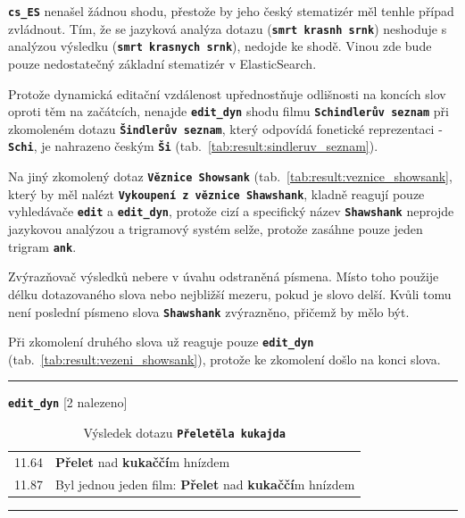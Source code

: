 \documentclass[11pt,letterpaper,oneside,openright]{book}
\newcommand{\bftt}[1]{\texttt{\textbf{#1}}}
\newcommand{\boldred}[1]{\textbf{\color{red} #1}}
\newcommand{\horizlina}%
{
    \mbox{}\vspace{1em}
    \hrule
    \mbox{}
}
\begin{document}
\bftt{cs\_ES} nenašel žádnou shodu, přestože by jeho český stematizér měl
tenhle případ zvládnout. Tím, že se jazyková analýza dotazu
(\bftt{smrt~krasnh~srnk}) neshoduje s analýzou výsledku
(\bftt{smrt~krasnych~srnk}), nedojde ke shodě. Vinou zde bude pouze
nedostatečný základní stematizér v ElasticSearch.

\mbox{}\mbox{}

Protože dynamická editační vzdálenost upřednostňuje odlišnosti na
koncích slov oproti těm na začátcích, nenajde \bftt{edit\_dyn} shodu
filmu \bftt{Schindlerův seznam} při zkomoleném dotazu \bftt{Šindlerův
seznam}, který odpovídá fonetické reprezentaci - \bftt{Schi}, je
nahrazeno českým \bftt{Ši} (tab.~\ref{tab:result:sindleruv_seznam}).

\mbox{}\mbox{}

Na jiný zkomolený dotaz \bftt{Věznice Showsank}
(tab.~\ref{tab:result:veznice_showsank}, který by měl nalézt \bftt{Vykoupení z
věznice Shawshank}, kladně reagují pouze vyhledávače \bftt{edit} a
\bftt{edit\_dyn}, protože cizí a specifický název \bftt{Shawshank} neprojde
jazykovou analýzou a trigramový systém selže, protože zasáhne pouze jeden
trigram \bftt{ank}.

Zvýrazňovač výsledků nebere v úvahu odstraněná písmena. Místo toho použije
délku dotazovaného slova nebo nejbližší mezeru, pokud je slovo delší. Kvůli
tomu není poslední písmeno slova \bftt{Shawshank} zvýrazněno, přičemž by mělo
být.

\mbox{}\mbox{}

Při zkomolení druhého slova už reaguje pouze \bftt{edit\_dyn}
(tab.~\ref{tab:result:vezeni_showsank}), protože ke zkomolení došlo na
konci slova.

\mbox{}\mbox{}

\begin{table}[H]
\begin{tt}
\horizlina

\bftt{edit\_dyn} [2 nalezeno]\vspace{5pt}

\begin{tabulary}{1.1\textwidth}{LL}
11.64 & \boldred{Přelet} nad \boldred{kukaččí}m hnízdem \\
11.87 & Byl jednou jeden film: \boldred{Přelet} nad \boldred{kukaččí}m hnízdem \\
\end{tabulary}
\horizlina

\end{tt}
\caption{Výsledek dotazu \bftt{Přeletěla kukajda}}
\label{tab:result:preletela_kukajda}
\end{table}
\end{document}
